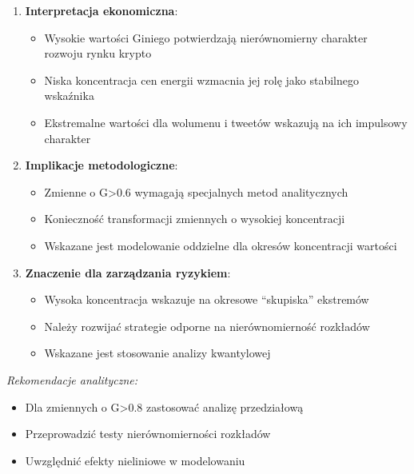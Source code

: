 \documentclass[
  11pt,
]{article}
\providecommand{\tightlist}{%
  \setlength{\itemsep}{0pt}\setlength{\parskip}{0pt}}
\begin{document}
\begin{enumerate}
\def\labelenumi{\arabic{enumi}.}
\tightlist
\item
  \textbf{Interpretacja ekonomiczna}: \vspace{0.2cm}

  \begin{itemize}
  \tightlist
  \item
    Wysokie wartości Giniego potwierdzają nierównomierny charakter
    rozwoju rynku krypto
  \item
    Niska koncentracja cen energii wzmacnia jej rolę jako stabilnego
    wskaźnika
  \item
    Ekstremalne wartości dla wolumenu i tweetów wskazują na ich
    impulsowy charakter
  \end{itemize}
\item
  \textbf{Implikacje metodologiczne}: \vspace{0.2cm}

  \begin{itemize}
  \tightlist
  \item
    Zmienne o G\textgreater0.6 wymagają specjalnych metod analitycznych
  \item
    Konieczność transformacji zmiennych o wysokiej koncentracji
  \item
    Wskazane jest modelowanie oddzielne dla okresów koncentracji
    wartości
  \end{itemize}
\item
  \textbf{Znaczenie dla zarządzania ryzykiem}: \vspace{0.2cm}

  \begin{itemize}
  \tightlist
  \item
    Wysoka koncentracja wskazuje na okresowe ``skupiska'' ekstremów
  \item
    Należy rozwijać strategie odporne na nierównomierność rozkładów
  \item
    Wskazane jest stosowanie analizy kwantylowej
  \end{itemize}
\end{enumerate}

\vspace{0.3cm}

\textit{Rekomendacje analityczne:}

\begin{itemize}
\item Dla zmiennych o G>0.8 zastosować analizę przedziałową
\item Przeprowadzić testy nierównomierności rozkładów
\item Uwzględnić efekty nieliniowe w modelowaniu
\end{itemize}
\end{document}
